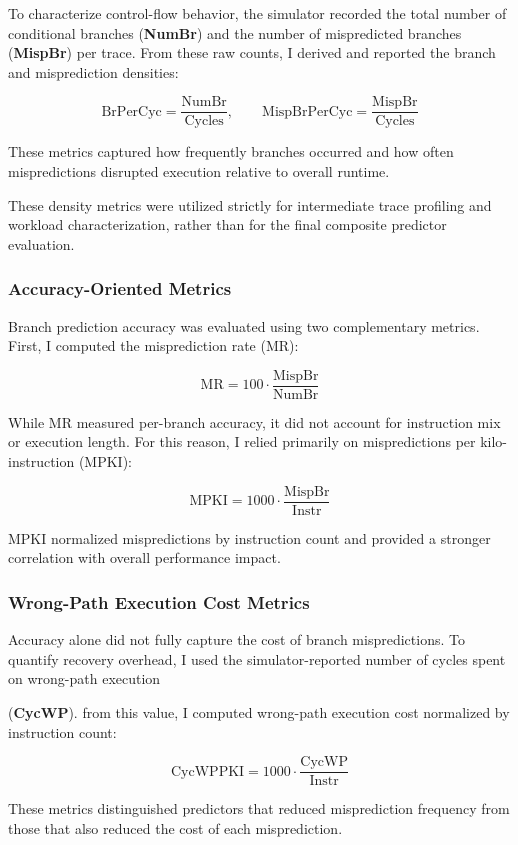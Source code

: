 \documentclass[11pt,a4paper]{article}
\begin{document}
To characterize control-flow behavior, the simulator recorded the total number of conditional branches
(\textbf{NumBr}) and the number of mispredicted branches (\textbf{MispBr}) per trace. From these raw
counts, I derived and reported the branch and misprediction densities:

\[
\text{BrPerCyc} = \frac{\text{NumBr}}{\text{Cycles}}, \qquad
\text{MispBrPerCyc} = \frac{\text{MispBr}}{\text{Cycles}}
\]

These metrics captured how frequently branches occurred and how often mispredictions disrupted
execution relative to overall runtime.

These density metrics were utilized strictly for intermediate trace profiling and workload
characterization, rather than for the final composite predictor evaluation.

\subsubsection{Accuracy-Oriented Metrics}

Branch prediction accuracy was evaluated using two complementary metrics. First, I computed the
misprediction rate (MR):

\[
\text{MR} = 100 \cdot \frac{\text{MispBr}}{\text{NumBr}}
\]

While MR measured per-branch accuracy, it did not account for instruction mix or execution length.
For this reason, I relied primarily on mispredictions per kilo-instruction (MPKI):

\[
\text{MPKI} = 1000 \cdot \frac{\text{MispBr}}{\text{Instr}}
\]

MPKI normalized mispredictions by instruction count and provided a stronger correlation with
overall performance impact.

\subsubsection{Wrong-Path Execution Cost Metrics}

Accuracy alone did not fully capture the cost of branch mispredictions. To quantify recovery
overhead, I used the simulator-reported number of cycles spent on wrong-path execution

(\textbf{CycWP}). from this value, I computed wrong-path execution cost normalized by instruction
count:

\[
\text{CycWPPKI} = 1000 \cdot \frac{\text{CycWP}}{\text{Instr}}
\]

These metrics distinguished predictors that reduced misprediction frequency from those that also
reduced the cost of each misprediction.
\end{document}
